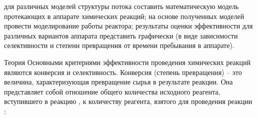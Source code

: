 

\goal для различных моделей структуры потока составить математическую модель протекающих в аппарате химических реакций; на основе полученных моделей провести моделирование работы реактора; результаты оценки эффективности для различных вариантов аппарата представить графически (в виде зависимости селективности и степени превращения от времени пребывания в аппарате).

Теория
Основными критериями эффективности проведения химических реакций являются конверсия и селективность. 
Конверсия (степень превращения) – это величина, характеризующая превращение сырья в результате реакции. Она представляет собой отношение общего количества исходного реагента, вступившего в реакцию , к количеству реагента, взятого для проведения реакции :